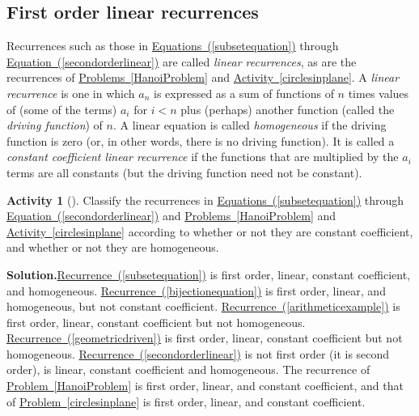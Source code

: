\documentclass[10pt,]{book}
\theoremstyle{plain}
\theoremstyle{definition}
\newtheorem{activity}[project]{Activity}
\numberwithin{equation}{chapter}
\newcommand{\lt}{<}
\begin{document}
\subsection[{First order linear recurrences}]{First order linear recurrences}\label{subsection-19}
Recurrences such as those in \hyperref[subsetequation]{Equations~(\ref{subsetequation})} through \hyperref[secondorderlinear]{Equation~(\ref{secondorderlinear})} are called \emph{linear recurrences}, as are the recurrences of \hyperref[HanoiProblem]{Problems~\ref{HanoiProblem}} and \hyperref[circlesinplane]{Activity~\ref{circlesinplane}}. A \emph{linear recurrence} is one in which \(a_n\) is expressed as a sum of functions of \(n\) times values of (some of the terms) \(a_i\) for \(i\lt n\) plus (perhaps) another function (called the \emph{driving function}) of \(n\). A linear equation is called \emph{homogeneous} if the driving function is zero (or, in other words, there is no driving function). It is called a \emph{constant coefficient linear recurrence} if the functions that are multiplied by the \(a_i\) terms are all constants (but the driving function need not be constant).%
\begin{activity}[]\label{classifyrecurrences}
Classify the recurrences in \hyperref[subsetequation]{Equations~(\ref{subsetequation})} through \hyperref[secondorderlinear]{Equation~(\ref{secondorderlinear})} and \hyperref[HanoiProblem]{Problems~\ref{HanoiProblem}} and \hyperref[circlesinplane]{Activity~\ref{circlesinplane}} according to whether or not they are constant coefficient, and whether or not they are homogeneous.%
\par\medskip\noindent%
\textbf{Solution.}\quad \hyperref[subsetequation]{Recurrence~(\ref{subsetequation})} is first order, linear, constant coefficient, and homogeneous. \hyperref[bijectionequation]{Recurrence~(\ref{bijectionequation})} is first order, linear, and homogeneous, but not constant coefficient. \hyperref[arithmeticexample]{Recurrence~(\ref{arithmeticexample})} is first order, linear, constant coefficient but not homogeneous. \hyperref[geometricdriven]{Recurrence~(\ref{geometricdriven})} is first order, linear, constant coefficient but not homogeneous. \hyperref[secondorderlinear]{Recurrence~(\ref{secondorderlinear})} is not first order (it is second order), is linear, constant coefficient and homogeneous. The recurrence of \hyperref[HanoiProblem]{Problem~\ref{HanoiProblem}} is first order, linear, and constant coefficient, and that of \hyperref[circlesinplane]{Problem~\ref{circlesinplane}} is first order, linear, and constant coefficient.%
\end{activity}
\end{document}
